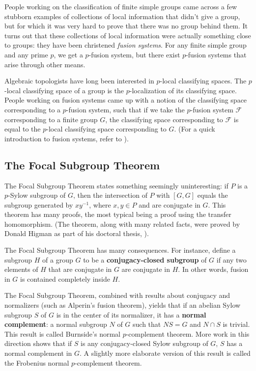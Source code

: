 \documentclass{amsart}
\renewcommand{\definedind}[1]{{\bf #1}}
\begin{document}
People working on the classification of finite simple groups came
across a few stubborn examples of collections of local information
that didn't give a group, but for which it was very hard to prove that
there was no group behind them. It turns out that these collections of
local information were actually something close to groups: they have
been christened {\em fusion systems}. For any finite simple group and
any prime $p$, we get a $p$-fusion system, but there exist $p$-fusion
systems that arise through other means. 

Algebraic topologists have long been interested in $p$-local
classifying spaces. The $p$-local classifying space of a group is the
$p$-localization of its classifying space. People working on fusion
systems came up with a notion of the classifying space corresponding
to a $p$-fusion system, such that if we take the $p$-fusion system
$\mathcal{F}$ corresponding to a finite group $G$, the classifying
space corresponding to $\mathcal{F}$ is equal to the $p$-local
classifying space corresponding to $G$. (For a quick introduction to
fusion systems, refer to \cite{fusionintro}).

\subsection{The Focal Subgroup Theorem}

The Focal Subgroup Theorem states something seemingly uninteresting:
if $P$ is a $p$-Sylow subgroup of $G$, then the intersection of $P$
with $[G,G]$ equals the subgroup generated by $xy^{-1}$, where $x,y
\in P$ and are conjugate in $G$. This theorem has many proofs, the
most typical being a proof using the transfer homomorphism. (The
theorem, along with many related facts, were proved by Donald Higman
as part of his doctoral thesis, \cite{higmanfocal}).

The Focal Subgroup Theorem has many consequences. For instance, define
a subgroup $H$ of a group $G$ to be a \definedind{conjugacy-closed
  subgroup} of $G$ if any two elements of $H$ that are conjugate in
$G$ are conjugate in $H$. In other words, fusion in $G$ is contained
completely inside $H$.

The Focal Subgroup Theorem, combined with results about conjugacy and
normalizers (such as Alperin's fusion theorem), yields that if an
abelian Sylow subgroup $S$ of $G$ is in the center of its normalizer,
it has a \definedind{normal complement}: a normal subgroup $N$ of $G$
such that $NS = G$ and $N \cap S$ is trivial. This result is called
Burnside's normal $p$-complement theorem. More work in this direction
shows that if $S$ is any conjugacy-closed Sylow subgroup of $G$, $S$
has a normal complement in $G$. A slightly more elaborate version of
this result is called the Frobenius normal $p$-complement theorem.
\end{document}
